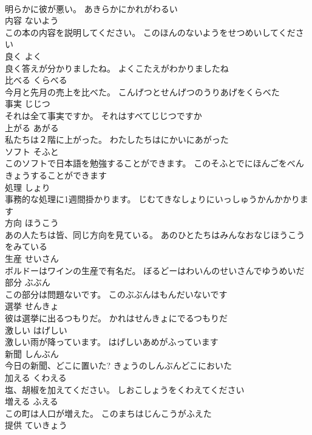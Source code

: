 \documentclass[8pt]{extreport}
\begin{document}
\begin{CJK}{UTF8}{min}
\\	明らかに彼が悪い。	あきらかにかれがわるい	
\\	内容	ないよう	
\\	この本の内容を説明してください。	このほんのないようをせつめいしてください	
\\	良く	よく	
\\	良く答えが分かりましたね。	よくこたえがわかりましたね	
\\	比べる	くらべる	
\\	今月と先月の売上を比べた。	こんげつとせんげつのうりあげをくらべた	
\\	事実	じじつ	
\\	それは全て事実ですか。	それはすべてじじつですか	
\\	上がる	あがる	
\\	私たちは２階に上がった。	わたしたちはにかいにあがった	
\\	ソフト	そふと	
\\	このソフトで日本語を勉強することができます。	このそふとでにほんごをべんきょうすることができます	
\\	処理	しょり	
\\	事務的な処理に1週間掛かります。	じむてきなしょりにいっしゅうかんかかります	
\\	方向	ほうこう	
\\	あの人たちは皆、同じ方向を見ている。	あのひとたちはみんなおなじほうこうをみている	
\\	生産	せいさん	
\\	ボルドーはワインの生産で有名だ。	ぼるどーはわいんのせいさんでゆうめいだ	
\\	部分	ぶぶん	
\\	この部分は問題ないです。	このぶぶんはもんだいないです	
\\	選挙	せんきょ	
\\	彼は選挙に出るつもりだ。	かれはせんきょにでるつもりだ	
\\	激しい	はげしい	
\\	激しい雨が降っています。	はげしいあめがふっています	
\\	新聞	しんぶん	
\\	今日の新聞、どこに置いた?	きょうのしんぶんどこにおいた	
\\	加える	くわえる	
\\	塩、胡椒を加えてください。	しおこしょうをくわえてください	
\\	増える	ふえる	
\\	この町は人口が増えた。	このまちはじんこうがふえた	
\\	提供	ていきょう	

\end{CJK}
\end{document}
